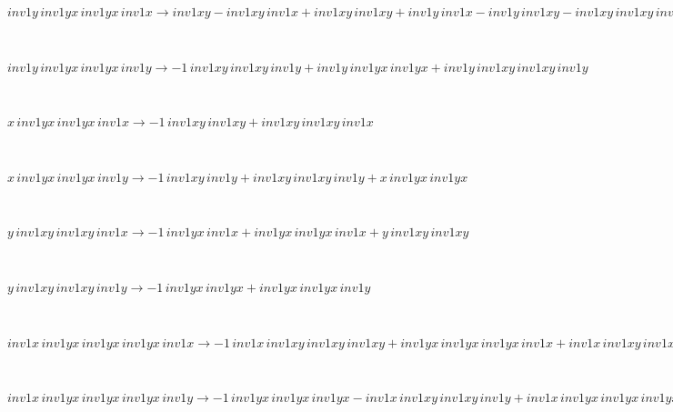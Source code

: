 \documentclass[rep10,leqno]{report}
\begin{document}
\begin{minipage}{6in}
$
inv1y\,
 inv1yx\,
 inv1yx\,
 inv1x\rightarrow inv1xy - inv1xy\,
 inv1x + inv1xy\,
 inv1xy + inv1y\,
 inv1x - inv1y\,
 inv1xy - inv1xy\,
 inv1xy\,
 inv1x + inv1y\,
 inv1xy\,
 inv1x - inv1y\,
 inv1xy\,
 inv1xy + inv1y\,
 inv1xy\,
 inv1xy\,
 inv1x
$
\end{minipage}\medskip \\
\begin{minipage}{6in}
$
inv1y\,
 inv1yx\,
 inv1yx\,
 inv1y\rightarrow -1\,
 inv1xy\,
 inv1xy\,
 inv1y + inv1y\,
 inv1yx\,
 inv1yx + inv1y\,
 inv1xy\,
 inv1xy\,
 inv1y
$
\end{minipage}\medskip \\
\begin{minipage}{6in}
$
x\,
 inv1yx\,
 inv1yx\,
 inv1x\rightarrow -1\,
 inv1xy\,
 inv1xy + inv1xy\,
 inv1xy\,
 inv1x
$
\end{minipage}\medskip \\
\begin{minipage}{6in}
$
x\,
 inv1yx\,
 inv1yx\,
 inv1y\rightarrow -1\,
 inv1xy\,
 inv1y + inv1xy\,
 inv1xy\,
 inv1y + x\,
 inv1yx\,
 inv1yx
$
\end{minipage}\medskip \\
\begin{minipage}{6in}
$
y\,
 inv1xy\,
 inv1xy\,
 inv1x\rightarrow -1\,
 inv1yx\,
 inv1x + inv1yx\,
 inv1yx\,
 inv1x + y\,
 inv1xy\,
 inv1xy
$
\end{minipage}\medskip \\
\begin{minipage}{6in}
$
y\,
 inv1xy\,
 inv1xy\,
 inv1y\rightarrow -1\,
 inv1yx\,
 inv1yx + inv1yx\,
 inv1yx\,
 inv1y
$
\end{minipage}\medskip \\
\begin{minipage}{6in}
$
inv1x\,
 inv1yx\,
 inv1yx\,
 inv1yx\,
 inv1x\rightarrow -1\,
 inv1x\,
 inv1xy\,
 inv1xy\,
 inv1xy + inv1yx\,
 inv1yx\,
 inv1yx\,
 inv1x + inv1x\,
 inv1xy\,
 inv1xy\,
 inv1xy\,
 inv1x
$
\end{minipage}\medskip \\
\begin{minipage}{6in}
$
inv1x\,
 inv1yx\,
 inv1yx\,
 inv1yx\,
 inv1y\rightarrow -1\,
 inv1yx\,
 inv1yx\,
 inv1yx - inv1x\,
 inv1xy\,
 inv1xy\,
 inv1y + inv1x\,
 inv1yx\,
 inv1yx\,
 inv1yx + inv1yx\,
 inv1yx\,
 inv1yx\,
 inv1y + inv1x\,
 inv1xy\,
 inv1xy\,
 inv1xy\,
 inv1y
$
\end{minipage}\medskip \\
\end{document}
